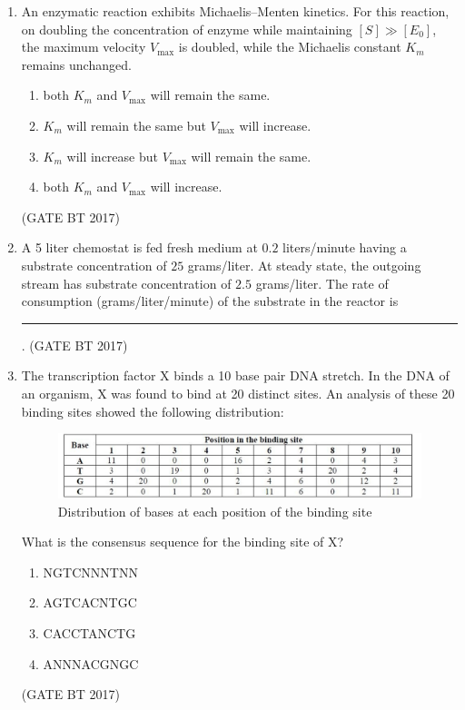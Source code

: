 \documentclass[journal,12pt,onecolumn]{IEEEtran}
\theoremstyle{remark}
\begin{document}
\begin{enumerate}
\item
An enzymatic reaction exhibits Michaelis--Menten kinetics. For this reaction, on doubling the concentration of enzyme while maintaining \([S] \gg [E_{0}]\), the maximum velocity \(V_{\max}\) is doubled, while the Michaelis constant \(K_m\) remains unchanged.

\begin{enumerate}
    \item both $K_{m}$ and $V_{\max}$ will remain the same.
    \item $K_{m}$ will remain the same but $V_{\max}$ will increase.
    \item $K_{m}$ will increase but $V_{\max}$ will remain the same.
    \item both $K_{m}$ and $V_{\max}$ will increase.
\end{enumerate}
\hfill (GATE BT 2017)

\item A 5 liter chemostat is fed fresh medium at $0.2$ liters/minute having a substrate concentration of $25$ grams/liter. At steady state, the outgoing stream has substrate concentration of $2.5$ grams/liter. The rate of consumption (grams/liter/minute) of the substrate in the reactor is \rule{2cm}{0.4pt}.
\hfill (GATE BT 2017)

\item The transcription factor X binds a 10 base pair DNA stretch. In the DNA of an organism, 
X was found to bind at 20 distinct sites. An analysis of these 20 binding sites showed the following distribution:

\begin{figure}[h!]
    \centering
    \includegraphics[width=\columnwidth]{figs/table.png} 
    \caption{Distribution of bases at each position of the binding site}
    \label{fig:binding-site}
\end{figure}

What is the consensus sequence for the binding site of X?

\begin{enumerate}
    \item NGTCNNNTNN
    \item AGTCACNTGC
    \item CACCTANCTG
    \item ANNNACGNGC
\end{enumerate}
\hfill (GATE BT 2017)


\end{enumerate}
\end{document}
